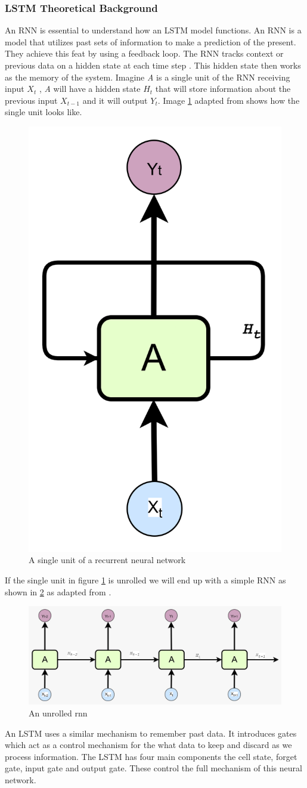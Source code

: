 \subsubsection{LSTM Theoretical Background \label{sec:lstm_background}}
 
An RNN is essential to understand how an LSTM model functions. An RNN is a model that utilizes past sets of information to make a prediction of the present. They achieve this feat by using a feedback loop. The RNN tracks context or previous data on a hidden state at each time step \cite{stryker_ibm_rnn}. This hidden state then works as the memory of the system. 
Imagine \textit{A} is a single unit of the RNN receiving input \textit{$X_t$} , \textit{A} will have a  hidden state \textit{$H_t$} that will store information about the previous input $X_{t-1}$ and it will output \textit{$Y_t$}. Image \ref{fig:rnnsingleunit} adapted from \cite{colah2015understanding} shows how the single unit looks like.

\begin{figure}[h]
	\centering
	\includegraphics[width=0.1\linewidth]{Chapters/images/rnn_singleunit}
	\caption{A single unit of a recurrent neural network}
	\label{fig:rnnsingleunit}
\end{figure}
If the single unit in figure \ref{fig:rnnsingleunit} is unrolled we will end up with a simple RNN as shown in \ref{fig:unrolledrnn} as adapted from \cite{colah2015understanding}.

\begin{figure}[H]
	\centering
	\includegraphics[width=0.5\linewidth,height=0.1\textheight]{Chapters/images/unrolled_rnn.jpeg}
	\caption{An unrolled rnn}
	\label{fig:unrolledrnn}
\end{figure}

An LSTM uses a similar mechanism  to remember past data. It introduces  gates which act as a control mechanism for the what data to keep and discard as we process information. The LSTM has four main components the cell state, forget gate, input gate and output gate. These control the full mechanism of this neural network.

